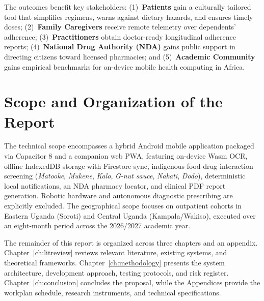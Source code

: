 The outcomes benefit key stakeholders: (1)~\textbf{Patients} gain a culturally tailored tool that simplifies regimens, warns against dietary hazards, and ensures timely doses; (2)~\textbf{Family Caregivers} receive remote telemetry over dependents' adherence; (3)~\textbf{Practitioners} obtain doctor-ready longitudinal adherence reports; (4)~\textbf{National Drug Authority (NDA)} gains public support in directing citizens toward licensed pharmacies; and (5)~\textbf{Academic Community} gains empirical benchmarks for on-device mobile health computing in Africa.

\section{Scope and Organization of the Report}

The technical scope encompasses a hybrid Android mobile application packaged via Capacitor 8 and a companion web PWA, featuring on-device Wasm OCR, offline IndexedDB storage with Firestore sync, indigenous food-drug interaction screening (\textit{Matooke}, \textit{Mukene}, \textit{Kalo}, \textit{G-nut sauce}, \textit{Nakati}, \textit{Dodo}), deterministic local notifications, an NDA pharmacy locator, and clinical PDF report generation. Robotic hardware and autonomous diagnostic prescribing are explicitly excluded. The geographical scope focuses on outpatient cohorts in Eastern Uganda (Soroti) and Central Uganda (Kampala/Wakiso), executed over an eight-month period across the 2026/2027 academic year.

The remainder of this report is organized across three chapters and an appendix. Chapter~\ref{ch:litreview} reviews relevant literature, existing systems, and theoretical frameworks. Chapter~\ref{ch:methodology} presents the system architecture, development approach, testing protocols, and risk register. Chapter~\ref{ch:conclusion} concludes the proposal, while the Appendices provide the workplan schedule, research instruments, and technical specifications.
